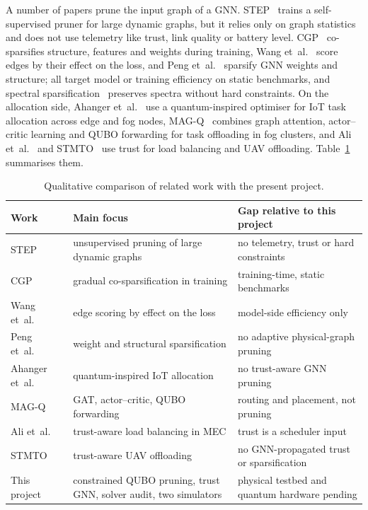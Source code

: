 A number of papers prune the input graph of a GNN. STEP~\cite{li2023step}
trains a self-supervised pruner for large dynamic graphs, but it relies only on
graph statistics and does not use telemetry like trust, link quality or battery
level.
CGP~\cite{liu2024cgp} co-sparsifies structure, features and weights during
training, Wang et~al.~\cite{wang2022} score edges by their effect on the loss,
and Peng et~al.~\cite{peng2022} sparsify GNN weights and structure; all target
model or training efficiency on static benchmarks, and spectral
sparsification~\cite{spielman2011} preserves spectra without hard
constraints. On the allocation side, Ahanger et~al.~\cite{ahanger2023} use a
quantum-inspired optimiser for IoT task allocation across edge and fog nodes,
MAG-Q~\cite{verma2026} combines graph attention, actor--critic learning and
QUBO forwarding for task offloading in fog clusters, and Ali
et~al.~\cite{ali2023} and STMTO~\cite{guo2021} use trust for load balancing and
UAV offloading. Table~\ref{tab:bg:related} summarises them.

\begin{table}[htbp]
\centering
\caption{Qualitative comparison of related work with the present project.}
\label{tab:bg:related}
\small
\begin{tabularx}{\linewidth}{@{}l X X@{}}
\toprule
Work & Main focus & Gap relative to this project \\
\midrule
STEP~\cite{li2023step} & unsupervised pruning of large dynamic graphs & no telemetry, trust or hard constraints \\
CGP~\cite{liu2024cgp} & gradual co-sparsification in training & training-time, static benchmarks \\
Wang et~al.~\cite{wang2022} & edge scoring by effect on the loss & model-side efficiency only \\
Peng et~al.~\cite{peng2022} & weight and structural sparsification & no adaptive physical-graph pruning \\
Ahanger et~al.~\cite{ahanger2023} & quantum-inspired IoT allocation & no trust-aware GNN pruning \\
MAG-Q~\cite{verma2026} & GAT, actor--critic, QUBO forwarding & routing and placement, not pruning \\
Ali et~al.~\cite{ali2023} & trust-aware load balancing in MEC & trust is a scheduler input \\
STMTO~\cite{guo2021} & trust-aware UAV offloading & no GNN-propagated trust or sparsification \\
\midrule
This project & constrained QUBO pruning, trust GNN, solver audit, two simulators & physical testbed and quantum hardware pending \\
\bottomrule
\end{tabularx}
\end{table}

